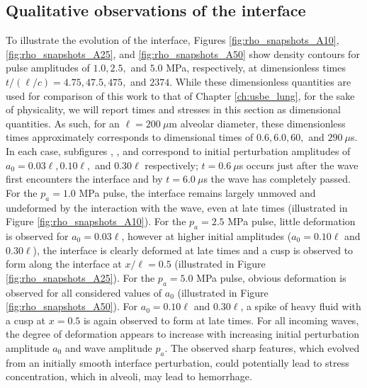 \subsection{Qualitative observations of the interface}
To illustrate the evolution of the interface, Figures
\ref{fig:rho_snapshots_A10}, \ref{fig:rho_snapshots_A25}, and
\ref{fig:rho_snapshots_A50} show density contours for pulse amplitudes
of $1.0, 2.5,$ and $5.0$ MPa, respectively, at dimensionless times
$t/(\ell/c)=4.75, 47.5, 475,$ and $2374$. While these dimensionless
quantities are used for comparison of this work to that of Chapter
\ref{ch:usbe_lung}, for the sake of physicality, we will report times
and stresses in this section as dimensional quantities. As such, for
an $\ell = 200~\mu$m alveolar diameter, these dimensionless times
approximately corresponds to dimensional times of $0.6, 6.0, 60,$ and
$290~\mu$s. In each case, subfigures ,
, and 
correspond to initial perturbation amplitudes of
$a_0=0.03\ell, 0.10\ell,$ and $0.30\ell$ respectively; $t = 0.6~ \mu$s
occurs just after the wave first encounters the interface and by
$t= 6.0~ \mu$s the wave has completely passed. For the $p_a = 1.0$ MPa
pulse, the interface remains largely unmoved and undeformed by the
interaction with the wave, even at late times (illustrated in Figure
\ref{fig:rho_snapshots_A10}). For the $p_a = 2.5$ MPa pulse, little
deformation is observed for $a_0 = 0.03\ell$, however at higher
initial amplitudes ($a_0 = 0.10\ell$ and $0.30\ell$), the interface is
clearly deformed at late times and a cusp is observed to form along
the interface at $x/\ell = 0.5$ (illustrated in Figure
\ref{fig:rho_snapshots_A25}). For the $p_a = 5.0$ MPa pulse, obvious
deformation is observed for all considered values of $a_0$
(illustrated in Figure \ref{fig:rho_snapshots_A50}). For
$a_0 = 0.10\ell$ and $0.30\ell$, a spike of heavy fluid with a cusp at
$x = 0.5$ is again observed to form at late times.  For all incoming
waves, the degree of deformation appears to increase with increasing
initial perturbation amplitude $a_0$ and wave amplitude $p_a$. The
observed sharp features, which evolved from an initially smooth
interface perturbation, could potentially lead to stress concentration,
which in alveoli, may lead to hemorrhage.
% 
